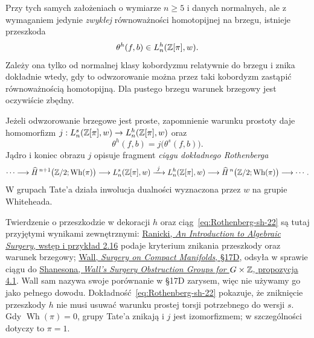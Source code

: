 \begin{twierdzenie}\label{thm:Wall-h-22}
Przy tych samych założeniach o wymiarze $n\geq5$
i danych normalnych, ale z wymaganiem jedynie
\emph{zwykłej} równoważności homotopijnej na brzegu,
istnieje przeszkoda
\[
 \theta^h(f,b)\in L^h_n(\mathbb{Z}[\pi],w).
\]
Zależy ona tylko od normalnej klasy kobordyzmu
relatywnie do brzegu i znika dokładnie wtedy,
gdy to odwzorowanie można przez taki kobordyzm zastąpić
równoważnością homotopijną. Dla pustego brzegu
warunek brzegowy jest oczywiście zbędny.

Jeżeli odwzorowanie brzegowe jest proste, zapomnienie
warunku prostoty daje homomorfizm
$j:L^s_n(\mathbb{Z}[\pi],w)\to L^h_n(\mathbb{Z}[\pi],w)$ oraz
\[
 \theta^h(f,b)=j\bigl(\theta^s(f,b)\bigr).
\]
Jądro i koniec obrazu $j$ opisuje fragment
\emph{ciągu dokładnego Rothenberga}
\begin{equation}\label{eq:Rothenberg-sh-22}
 \cdots\longrightarrow
 \widehat H^{\,n+1}\bigl(\mathbb{Z}/2;\operatorname{Wh}(\pi)\bigr)
 \longrightarrow L^s_n(\mathbb{Z}[\pi],w)
 \xrightarrow{\ j\ } L^h_n(\mathbb{Z}[\pi],w)
 \longrightarrow
 \widehat H^{\,n}\bigl(\mathbb{Z}/2;\operatorname{Wh}(\pi)\bigr)
 \longrightarrow\cdots .
\end{equation}
W grupach Tate'a działa inwolucja dualności
wyznaczona przez $w$ na grupie Whiteheada.
\end{twierdzenie}

Twierdzenie o przeszkodzie w dekoracji $h$
oraz ciąg~\eqref{eq:Rothenberg-sh-22} są tutaj
przyjętymi wynikami zewnętrznymi:
\href{https://www.maths.ed.ac.uk/~v1ranick/surgery/ranicki.pdf}
{Ranicki, \emph{An Introduction to Algebraic Surgery},
 wstęp i przykład 2.16} podaje kryterium
znikania przeszkody oraz warunek brzegowy;
\href{https://www.maths.ed.ac.uk/~v1ranick/books/scm.pdf}
{Wall, \emph{Surgery on Compact Manifolds}, §17D},
odsyła w sprawie ciągu do
\href{https://webhomes.maths.ed.ac.uk/~v1ranick/papers/shan.pdf}
{Shanesona, \emph{Wall's Surgery Obstruction
Groups for $G\times\mathbb{Z}$}, propozycja 4.1}.
Wall sam nazywa swoje porównanie w §17D
zarysem, więc nie używamy go jako pełnego dowodu.
Dokładność~\eqref{eq:Rothenberg-sh-22} pokazuje,
że zniknięcie przeszkody $h$ nie musi usuwać
warunku prostej torsji potrzebnego do wersji $s$.
Gdy $\operatorname{Wh}(\pi)=0$, grupy Tate'a
znikają i $j$ jest izomorfizmem; w szczególności
dotyczy to $\pi=1$.

